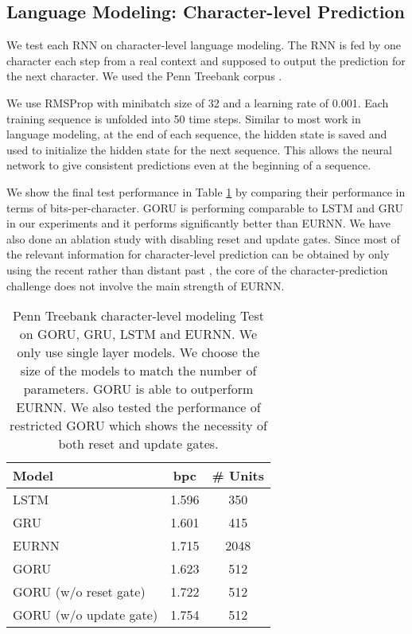 \documentclass[letterpaper]{article} \usepackage{aaai18}  \usepackage{times}  \usepackage{helvet}  \usepackage{courier}  \usepackage{url}  \usepackage{graphicx}
\begin{document}
\subsection{Language Modeling: Character-level Prediction}

We test each RNN on character-level language modeling. The RNN is fed by one character each step from a real context and supposed to output the prediction for the next character. 
We used the Penn Treebank corpus \cite{marcus1993building}. 

We use RMSProp with minibatch size of 32 and a learning rate of 0.001. Each training sequence is unfolded into 50 time steps. Similar to most work in language modeling, at the end of each sequence, the hidden state is saved and used to initialize the hidden state for the next sequence. This allows the neural network to give consistent predictions even at the beginning of a sequence.

We show the final test performance in Table \ref{tbl:ptb} by comparing their performance in terms of bits-per-character. GORU is performing comparable to LSTM and GRU in our experiments and it performs significantly better than EURNN. We have also done an ablation study with disabling reset and update gates.
Since most of the relevant information for character-level prediction can be obtained by only using the recent rather than distant past \cite{karpathy2015visualizing}, the core of the character-prediction challenge does not involve the main strength of EURNN.  




\begin{table}[h!]
\centering
\begin{tabular}{lcc}
\hline
Model           & bpc & \# Units\\
\hline
LSTM          & 1.596 & 350 \\GRU         & 1.601  & 415 \\EURNN       & 1.715  & 2048 \\GORU       & 1.623  & 512 \\GORU (w/o reset gate)       & 1.722  & 512 \\GORU (w/o update gate)       & 1.754  & 512 \\\hline
\end{tabular}
\caption{Penn Treebank character-level modeling Test on GORU, GRU, LSTM and EURNN. We only use single layer models. We choose the size of the models to match the number of parameters. GORU is able to outperform EURNN. We also tested the performance of restricted GORU which shows the necessity of both reset and update gates.}
\label{tbl:ptb}
\end{table}
\end{document}
